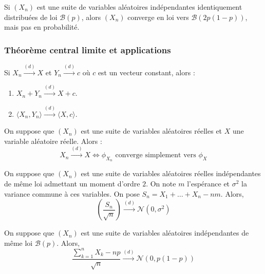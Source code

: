 
  \begin{cexample}
    Si $(X_n)$ est une suite de variables aléatoires indépendantes identiquement distribuées de loi $\mathcal{B}(p)$, alors $(X_n)$ converge en loi vers $\mathcal{B}(2p(1-p))$, mais pas en probabilité.
  \end{cexample}

  \subsubsection{Théorème central limite et applications}


  \begin{theorem}[Slutsky]
    Si $X_n \overset{(d)}{\longrightarrow} X$ et $Y_n \overset{(d)}{\longrightarrow} c$ où $c$ est un vecteur constant, alors :
    \begin{enumerate}[label=(\roman*)]
      \item $X_n + Y_n \overset{(d)}{\longrightarrow} X + c$.
      \item $\langle X_n, Y_n \rangle \overset{(d)}{\longrightarrow} \langle X, c \rangle$.
    \end{enumerate}
  \end{theorem}


  \begin{theorem}[Lévy]
    On suppose que $(X_n)$ est une suite de variables aléatoires réelles et $X$ une variable aléatoire réelle. Alors :
    \[ X_n \overset{(d)}{\longrightarrow} X \iff \phi_{X_n} \text{ converge simplement vers } \phi_X \]
  \end{theorem}


  \begin{theorem}
    On suppose que $(X_n)$ est une suite de variables aléatoires réelles indépendantes de même loi admettant un moment d'ordre $2$. On note $m$ l'espérance et $\sigma^2$ la variance commune à ces variables. On pose $S_n = X_1 + \dots + X_n - nm$. Alors,
    \[ \left ( \frac{S_n}{\sqrt{n}} \right) \overset{(d)}{\longrightarrow} \mathcal{N}(0, \sigma^2) \]
  \end{theorem}

  \begin{application}
    On suppose que $(X_n)$ est une suite de variables aléatoires indépendantes de même loi $\mathcal{B}(p)$. Alors,
    \[ \frac{\sum_{k=1}^{n} X_k - np}{\sqrt{n}} \overset{(d)}{\longrightarrow} \mathcal{N}(0, p(1-p)) \]
  \end{application}

